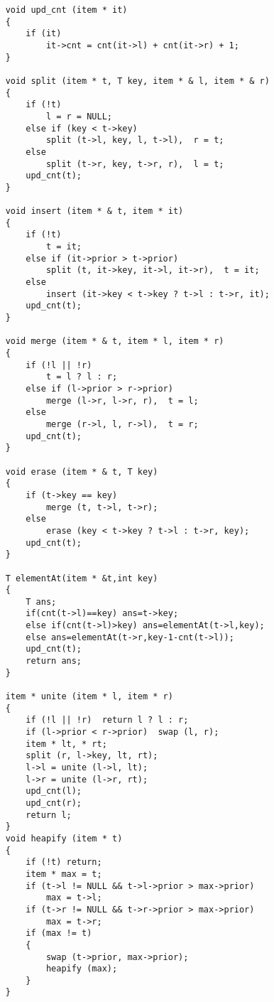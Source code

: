 \documentclass{article}
\begin{document}
\begin{multicols}{3}[]
\begin{verbatim}
    void upd_cnt (item * it)
    {
        if (it)
            it->cnt = cnt(it->l) + cnt(it->r) + 1;
    }

    void split (item * t, T key, item * & l, item * & r)
    {
        if (!t)
            l = r = NULL;
        else if (key < t->key)
            split (t->l, key, l, t->l),  r = t;
        else
            split (t->r, key, t->r, r),  l = t;
        upd_cnt(t);
    }

    void insert (item * & t, item * it)
    {
        if (!t)
            t = it;
        else if (it->prior > t->prior)
            split (t, it->key, it->l, it->r),  t = it;
        else
            insert (it->key < t->key ? t->l : t->r, it);
        upd_cnt(t);
    }

    void merge (item * & t, item * l, item * r)
    {
        if (!l || !r)
            t = l ? l : r;
        else if (l->prior > r->prior)
            merge (l->r, l->r, r),  t = l;
        else
            merge (r->l, l, r->l),  t = r;
        upd_cnt(t);
    }

    void erase (item * & t, T key)
    {
        if (t->key == key)
            merge (t, t->l, t->r);
        else
            erase (key < t->key ? t->l : t->r, key);
        upd_cnt(t);
    }

    T elementAt(item * &t,int key)
    {
        T ans;
        if(cnt(t->l)==key) ans=t->key;
        else if(cnt(t->l)>key) ans=elementAt(t->l,key);
        else ans=elementAt(t->r,key-1-cnt(t->l));
        upd_cnt(t);
        return ans;
    }

    item * unite (item * l, item * r)
    {
        if (!l || !r)  return l ? l : r;
        if (l->prior < r->prior)  swap (l, r);
        item * lt, * rt;
        split (r, l->key, lt, rt);
        l->l = unite (l->l, lt);
        l->r = unite (l->r, rt);
        upd_cnt(l);
        upd_cnt(r);
        return l;
    }
    void heapify (item * t)
    {
        if (!t) return;
        item * max = t;
        if (t->l != NULL && t->l->prior > max->prior)
            max = t->l;
        if (t->r != NULL && t->r->prior > max->prior)
            max = t->r;
        if (max != t)
        {
            swap (t->prior, max->prior);
            heapify (max);
        }
    }


\end{verbatim}
\end{multicols}
\end{document}
